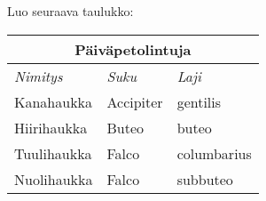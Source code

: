     \begin{harj}
        Luo seuraava taulukko:
        \begin{table}
            \begin{serif}
                \begin{tabular}{|l|l|l|}
                    \hline
                    \multicolumn{3}{|c|}{\textbf{Päiväpetolintuja}}\\
                    \hline
                    \textit{Nimitys} & \textit{Suku} & \textit{Laji}\\ \hline
                    Kanahaukka & Accipiter &  gentilis\\ \hline
                    Hiirihaukka & Buteo & buteo\\ \hline
                    Tuulihaukka & Falco & columbarius\\\hline
                    Nuolihaukka & Falco & subbuteo\\ \hline
                \end{tabular}
            \end{serif}
        \end{table}
    \end{harj}
